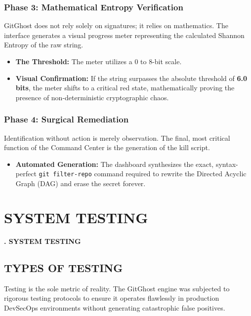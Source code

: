 \documentclass[12pt, a4paper, oneside]{report}
\begin{document}
\subsection{Phase 3: Mathematical Entropy Verification}
GitGhost does not rely solely on signatures; it relies on mathematics. The interface generates a visual progress meter representing the calculated Shannon Entropy of the raw string.
\begin{itemize}
    \item \textbf{The Threshold:} The meter utilizes a 0 to 8-bit scale. 
    \item \textbf{Visual Confirmation:} If the string surpasses the absolute threshold of \textbf{6.0 bits}, the meter shifts to a critical red state, mathematically proving the presence of non-deterministic cryptographic chaos.
\end{itemize}

\subsection{Phase 4: Surgical Remediation}
Identification without action is merely observation. The final, most critical function of the Command Center is the generation of the kill script.
\begin{itemize}
    \item \textbf{Automated Generation:} The dashboard synthesizes the exact, syntax-perfect \texttt{git filter-repo} command required to rewrite the Directed Acyclic Graph (DAG) and erase the secret forever.
\end{itemize}

\chapter{SYSTEM TESTING}
\begin{center}
    {\Large \textbf{\thechapter. SYSTEM TESTING} \par}
\end{center}
\vspace{1cm}

\section{TYPES OF TESTING}
Testing is the sole metric of reality. The GitGhost engine was subjected to rigorous testing protocols to ensure it operates flawlessly in production DevSecOps environments without generating catastrophic false positives.
\end{document}
